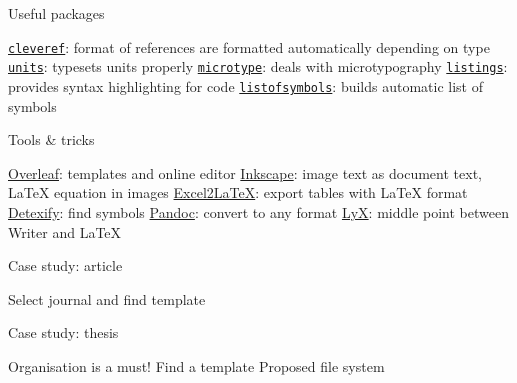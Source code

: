 \begin{frame}{Useful packages}
 \begin{fullpageitemize}
  \itemR \href{https://ctan.org/pkg/cleveref}{\texttt{cleveref}}: format of references are formatted automatically depending on type
  \itemR \href{https://ctan.org/tex-archive/macros/latex/contrib/units/}{\texttt{units}}: typesets units properly
  \itemR \href{https://ctan.org/tex-archive/macros/latex/contrib/microtype/}{\texttt{microtype}}: deals with microtypography
  \itemR \href{https://www.ctan.org/pkg/listings}{\texttt{listings}}: provides syntax highlighting for code
  \itemR \href{https://www.ctan.org/pkg/listofsymbols}{\texttt{listofsymbols}}: builds automatic list of symbols
\end{fullpageitemize}


\end{frame}

\begin{frame}{Tools \& tricks}
 \begin{fullpageitemize}
  \itemR \href{https://www.overleaf.com/}{Overleaf}: templates and online editor
  \itemR \href{http://wiki.inkscape.org/wiki/index.php/LaTeX}{Inkscape}: image text as document text, LaTeX equation in images
  \itemR \href{https://www.ctan.org/tex-archive/support/excel2latex/}{Excel2LaTeX}: export tables with LaTeX format
  \itemR \href{http://detexify.kirelabs.org/classify.html}{Detexify}: find symbols
  \itemR \href{http://pandoc.org/}{Pandoc}: convert to any format
  \itemR \href{https://www.lyx.org/}{LyX}: middle point between Writer and LaTeX
\end{fullpageitemize}
 
\end{frame}

\begin{frame}{Case study: article}
 
 \begin{fullpageitemize}
	\itemR Select journal and find template
 \end{fullpageitemize} 
 
 \note{}
\end{frame}

\begin{frame}{Case study: thesis}
 
 \begin{fullpageitemize}
	\itemR Organisation is a must!
	\itemR Find a template
	\itemR Proposed file system
 \end{fullpageitemize} 
 
 
\end{frame}

